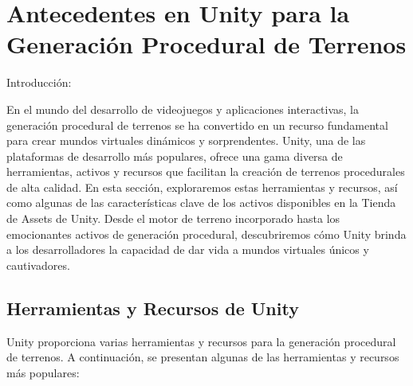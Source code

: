 \section{Antecedentes en Unity para la Generación Procedural de Terrenos}

Introducción:

En el mundo del desarrollo de videojuegos y aplicaciones interactivas, la generación procedural de terrenos se ha convertido en un recurso fundamental para crear mundos virtuales dinámicos y sorprendentes. Unity, una de las plataformas de desarrollo más populares, ofrece una gama diversa de herramientas, activos y recursos que facilitan la creación de terrenos procedurales de alta calidad. En esta sección, exploraremos estas herramientas y recursos, así como algunas de las características clave de los activos disponibles en la Tienda de Assets de Unity. Desde el motor de terreno incorporado hasta los emocionantes activos de generación procedural, descubriremos cómo Unity brinda a los desarrolladores la capacidad de dar vida a mundos virtuales únicos y cautivadores.

\subsection{Herramientas y Recursos de Unity}

Unity proporciona varias herramientas y recursos para la generación procedural de terrenos. A continuación, se presentan algunas de las herramientas y recursos más populares:

